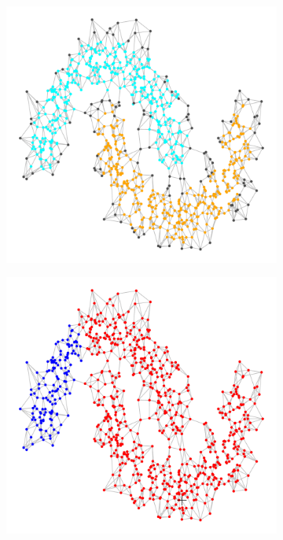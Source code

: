 \documentclass{article}
\newcommand{\1}{\mathbf{1}}
\theoremstyle{aldenthm}
\theoremstyle{aldenrmrk}
\begin{document}
\begin{figure}
\begin{adjustbox}{minipage=\linewidth}
		\begin{subfigure}{.24\linewidth}
			\includegraphics[width=\linewidth]{example2plots/row3_true_density_cluster}
			\caption{}
		\end{subfigure}
		\begin{subfigure}{.24\linewidth}
			\includegraphics[width=\linewidth]{example2plots/row3_ppr_cluster}

\end{subfigure}
\end{adjustbox}
\end{figure}
\end{document}
